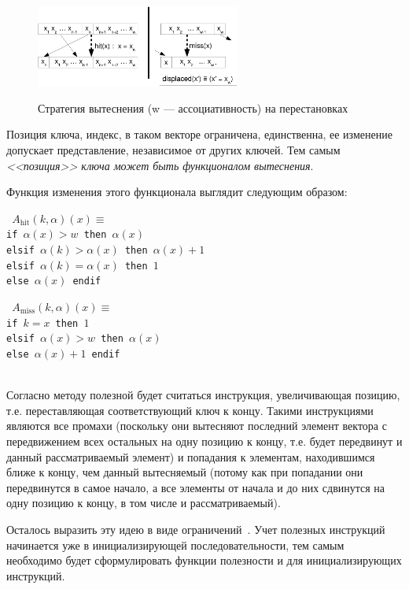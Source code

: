 \begin{figure}[h] \center
  \includegraphics[width=0.6\textwidth]{2.theor/lru1}\\
  \caption{Стратегия вытеснения \LRU (w --- ассоциативность) на
перестановках}\label{fig:lru1}
\end{figure}

Позиция ключа, индекс, в таком векторе ограничена, единственна, ее изменение допускает представление, независимое от других ключей. Тем самым \emph{<<позиция>> ключа может быть функционалом вытеснения}.

Функция изменения этого функционала выглядит следующим образом:\\

\parbox{0.5\textwidth}{ \tt
$A_{\mbox{hit}}(k, \alpha)(x) \equiv$\\
if $\alpha(x) > w$ then $\alpha(x)$\\
elsif $\alpha(k) > \alpha(x)$ then $\alpha(x)+1$\\
elsif $\alpha(k) = \alpha(x)$ then $1$\\
else $\alpha(x)$ endif%
}\parbox{0.5\textwidth}{\tt
$A_{\mbox{miss}}(k, \alpha)(x) \equiv$\\
if $k = x$ then $1$\\
elsif $\alpha(x) > w$ then $\alpha(x)$\\
else $\alpha(x) + 1$ endif}\\

Согласно методу полезной будет считаться инструкция, увеличивающая позицию, т.е.
переставляющая соответствующий ключ к концу. Такими инструкциями являются все
промахи (поскольку они
вытесняют последний элемент вектора с передвижением всех остальных на одну
позицию к концу, т.е. будет передвинут и данный рассматриваемый элемент) и
попадания к элементам, находившимся ближе к концу, чем данный вытесняемый
(потому как при попадании они
передвинутся в самое начало, а все элементы от начала и до них сдвинутся на одну
позицию к концу, в том числе и рассматриваемый).

Осталось выразить эту идею в виде ограничений~\cite{my_ewdts_2009}.
Учет полезных инструкций начинается уже в инициализирующей последовательности,
тем самым необходимо будет сформулировать функции полезности и для
инициализирующих инструкций.

